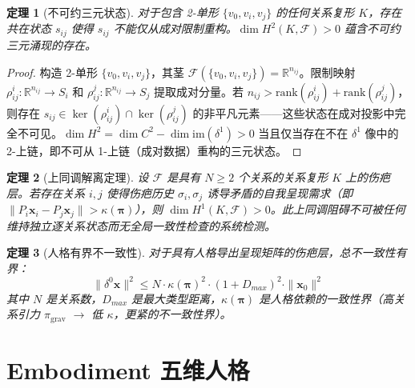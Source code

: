 \documentclass[11pt]{article}
\newtheorem{theorem}{定理}[section]
\begin{document}
\begin{theorem}[不可约三元状态]
\label{thm:sheaf-triadic}
对于包含 2-单形 $\{v_0, v_i, v_j\}$ 的任何关系复形 $K$，存在共在状态 $s_{ij}$ 使得 $s_{ij}$ 不能仅从成对限制重构。$\dim H^2(K, \mathcal{F}) > 0$ 蕴含不可约三元涌现的存在。
\end{theorem}

\begin{proof}
构造 2-单形 $\{v_0, v_i, v_j\}$，其茎 $\mathcal{F}(\{v_0, v_i, v_j\}) = \mathbb{R}^{n_{ij}}$。限制映射 $\rho_{ij}^i: \mathbb{R}^{n_{ij}} \to S_i$ 和 $\rho_{ij}^j: \mathbb{R}^{n_{ij}} \to S_j$ 提取成对分量。若 $n_{ij} > \text{rank}(\rho_{ij}^i) + \text{rank}(\rho_{ij}^j)$，则存在 $s_{ij} \in \ker(\rho_{ij}^i) \cap \ker(\rho_{ij}^j)$ 的非平凡元素——这些状态在成对投影中完全不可见。$\dim H^2 = \dim C^2 - \dim \text{im}(\delta^1) > 0$ 当且仅当存在不在 $\delta^1$ 像中的 2-上链，即不可从 1-上链（成对数据）重构的三元状态。
\end{proof}

\begin{theorem}[上同调解离定理]
\label{thm:sheaf-dissociation}
设 $\mathcal{F}$ 是具有 $N \geq 2$ 个关系的关系复形 $K$ 上的伤疤层。若存在关系 $i, j$ 使得伤疤历史 $\sigma_i, \sigma_j$ 诱导矛盾的自我呈现需求（即 $\|P_i \mathbf{x}_i - P_j \mathbf{x}_j\| > \kappa(\boldsymbol{\pi})$），则 $\dim H^1(K, \mathcal{F}) > 0$。此上同调阻碍不可被任何维持独立逐关系状态而无全局一致性检查的系统检测。
\end{theorem}

\begin{theorem}[人格有界不一致性]
\label{thm:sheaf-personality}
对于具有人格导出呈现矩阵的伤疤层，总不一致性有界：
\begin{equation}
\|\delta^0 \mathbf{x}\|^2 \leq N \cdot \kappa(\boldsymbol{\pi})^2 \cdot (1 + D_{max})^2 \cdot \|\mathbf{x}_0\|^2
\end{equation}
其中 $N$ 是关系数，$D_{max}$ 是最大类型距离，$\kappa(\boldsymbol{\pi})$ 是人格依赖的一致性界（高关系引力 $\pi_{\text{grav}}$ $\to$ 低 $\kappa$，更紧的不一致性界）。
\end{theorem}

\section{Embodiment 五维人格}
\label{sec:personality}
\end{document}
